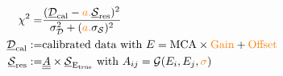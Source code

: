 \documentclass[10pt]{article}
\begin{document}
\begin{align*}\chi^2 =& \frac{(\underline{\mathcal{D}}_{\text{cal}} - {\color[rgb]{0.990445,0.502228,0.032891}a.}\underline{\mathcal{S}}_{\text{res}})^2}{\sigma^2_\mathcal{D} +  ({\color[rgb]{0.990445,0.502228,0.032891}a.}\sigma_\mathcal{S})^2}\\
\underline{\mathcal{D}}_{\text{cal}} :=&  \text{calibrated data with } E = \text{MCA}\times {\color[rgb]{0.990445,0.502228,0.032891}\text{Gain}} + {\color[rgb]{0.990445,0.502228,0.032891}\text{Offset}} \\
\underline{\mathcal{S}}_{\text{res}} :=&  \underline{\underline{A}}\times \underline{\mathcal{S}}_{\text{E}_\text{true}} \text{ with } A_{ij} = \mathcal{G}(E_i, E_j, {\color[rgb]{0.990445,0.502228,0.032891}\sigma})\end{align*}
\end{document}
